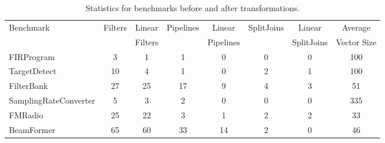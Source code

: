 \begin{table*}[t]
\begin{tabular}{|l|c|c||c|c||c|c||c|} 
\hline
Benchmark & Filters & Linear  & Pipelines & Linear    & SplitJoins & Linear     & Average  \\
          &         & Filters &           & Pipelines &            & SplitJoins & Vector Size\\
\hline
FIRProgram & 3 & 1 & 1 & 0 & 0 & 0 & 100 \\
\hline
TargetDetect & 10 & 4 & 1 & 0 & 2 & 1 & 100 \\
\hline
FilterBank & 27 & 25 & 17 & 9 & 4 & 3 & 51 \\
\hline
SamplingRateConverter & 5 & 3 & 2 & 0 & 0 & 0 & 335 \\
\hline
FMRadio & 25 & 22 & 3 & 1 & 2 & 2 & 33 \\
\hline
BeamFormer & 65 & 60 & 33 & 14 & 2 & 0 & 46 \\
\hline
\end{tabular}
\caption{Statistics for benchmarks before and after transformations.}
\label{fig:benchmark-stastics}
\end{table*}
